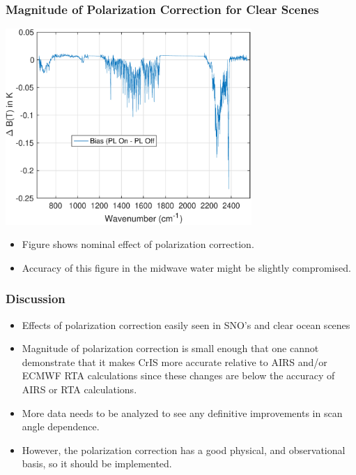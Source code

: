 \documentclass[10pt,t]{beamer} \usepackage[utf8]{inputenc}
\begin{document}
%
\begin{frame}
  \frametitle{Magnitude of Polarization Correction for Clear Scenes}
  \vspace{-0.125in} %
  \begin{center}
    \noindent\includegraphics[width=0.7\textwidth]{Figs/bias_on_minus_bias_off.pdf}
  \end{center}
\vspace{-0.05in}
  \begin{itemize}
    \item Figure shows nominal effect of polarization correction.
    \item Accuracy of this figure in the midwave water might be slightly compromised.
      \end{itemize}
    \end{frame}

%
\begin{frame}
  \frametitle{Discussion}
  \vspace{-0.1 in}
  \begin{itemize}
     \item Effects of polarization correction easily seen in SNO's and clear ocean scenes
     \item Magnitude of polarization correction is small enough that one cannot demonstrate that it makes CrIS more accurate relative to AIRS and/or ECMWF RTA calculations since these changes are below the accuracy of AIRS or RTA calculations.
     \item More data needs to be analyzed to see any definitive improvements in scan angle dependence.
     \item However, the polarization correction has a good physical, and observational basis, so it should be implemented.
  \end{itemize}

  
\end{frame}
\end{document}
